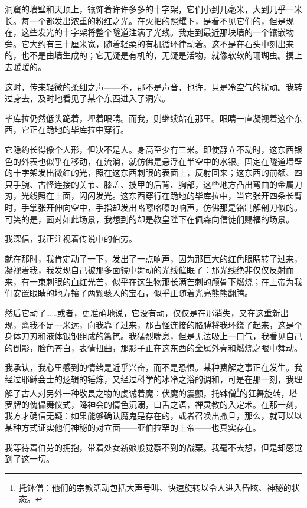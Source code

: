 \documentclass[AutoFakeBold=true]{book}
\begin{document}
洞窟的墙壁和天顶上，镶饰着许许多多的十字架，它们小到几毫米，大到几乎一米长。每一个都发出浓重的粉红之光。在火把的照耀下，是看不见它们的，但是现在，这些发光的十字架将整个隧道注满了光线。我走到最近那块墙的一个镶嵌物旁。它大约有三十厘米宽，随着轻柔的有机循环律动着。这不是在石头中刻出来的，也不是由墙生成的；它无疑是有机的，无疑是活物，就像软软的珊瑚虫。摸上去暖暖的。

这时，传来轻微的柔细之声——不，那不是声音，也许，只是冷空气的扰动。我转过身去，及时地看见了某个东西进入了洞穴。

毕库拉仍然低头跪着，埋着眼睛。而我，则继续站在那里。眼睛一直凝视着这个东西，它正在跪地的毕库拉中穿行。

它隐约长得像个人形，但决不是人。身高至少有三米。即使静立不动时，这东西银色的外表也似乎在移动，在流淌，就仿佛是悬浮在半空中的水银。固定在隧道墙壁的十字架发出微红的光，照在这东西刺眼的表面上，反射回来；这东西的前额、四只手腕、古怪连接的关节、膝盖、披甲的后背、胸部，这些地方凸出弯曲的金属刀刃，光线照在上面，闪闪发光。这东西穿行在跪地的毕库拉中，当它张开四条长臂时，手掌张开伸向空中，手指却发出咯嚓咯嚓的响声，仿佛那是铬制解剖刀似的。可笑的是，面对如此场景，我想到的却是教皇陛下在佩森向信徒们赐福的场景。

我深信，我正注视着传说中的伯劳。

就在那时，我肯定动了一下，发出了一点响声，因为那巨大的红色眼睛转了过来，凝视着我，我发现自己被那多面镜中舞动的光线催眠了：那光线绝非仅仅反射而来，有一束刺眼的血红光芒，似乎在这生物那长满芒刺的颅骨下燃烧；在上帝为我们安置眼睛的地方镶了两颗骇人的宝石，似乎正随着光亮熊熊翻腾。

然后它动了……或者，更准确地说，它没有动，仅仅是在那消失，又在这重新出现，离我不足一米远，向我靠了过来，那古怪连接的胳膊将我环绕了起来，这是个身体刀刃和液体银钢组成的篱笆。我猛烈喘息，但是无法吸上一口气，我看见自己的倒影，脸色苍白，表情扭曲，那影子正在这东西的金属外壳和燃烧之眼中舞动。

我承认，我心里感到的情绪是近乎兴奋，而不是恐惧。某种费解之事正在发生。我经过耶稣会士的逻辑的锤炼，又经过科学的冰冷之浴的调和，可是在那一刻，我理解了古人对另外一种敬畏之物的虔诚着魔：伏魔的震颤，托钵僧\footnote{托钵僧：他们的宗教活动包括大声号叫、快速旋转以令人进入昏眩、神秘的状态。}的狂舞旋转，塔罗牌的傀儡舞仪式，降神会的情色沉溺，口舌之语，禅灵教的入定术。在那一刻，我方才确信无疑：如果能够确认魔鬼是存在的，或者召唤出撒旦，那么，就可以以某种方式证实他们神秘的对立面——亚伯拉罕的上帝——也真实存在。

我等待着伯劳的拥抱，带着处女新娘般觉察不到的战栗。我毫不去想，但是却感觉到了这一切。
\end{document}
